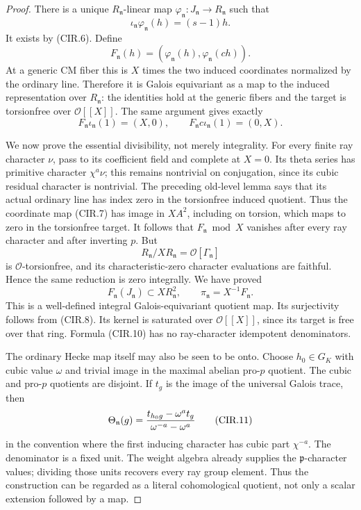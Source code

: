\begin{proof}
There is a unique \(R_{\mathfrak n}\)-linear map
\(\varphi_{\mathfrak n}:J_{\mathfrak n}\to R_{\mathfrak n}\)
such that
\[
 \iota_{\mathfrak n}\varphi_{\mathfrak n}(h)=(s-1)h.
\]
It exists by (CIR.6).  Define
\[
 F_{\mathfrak n}(h)=
       (\varphi_{\mathfrak n}(h),\varphi_{\mathfrak n}(ch)).
                                                               \tag{CIR.7}
\]
At a generic CM fiber this is \(X\) times the two induced
coordinates normalized by the ordinary line.  Therefore it is
Galois equivariant as a map to the induced representation over
\(R_{\mathfrak n}\): the identities hold at the generic fibers
and the target is torsionfree over \(\mathcal O[[X]]\).
The same argument gives exactly
\[
 F_{\mathfrak n}\iota_{\mathfrak n}(1)=(X,0),\qquad
 F_{\mathfrak n}c\iota_{\mathfrak n}(1)=(0,X).           \tag{CIR.8}
\]

We now prove the essential divisibility, not merely integrality.
For every finite ray character \(\nu\), pass to its coefficient
field and complete at \(X=0\).  Its theta series has primitive
character \(\chi^a\nu\); this remains nontrivial on conjugation,
since its cubic residual character is nontrivial.  The preceding
old-level lemma says that its actual ordinary line has index
zero in the torsionfree induced quotient.  Thus the coordinate
map (CIR.7) has image in \(XA^2\), including on torsion, which
maps to zero in the torsionfree target.  It follows that
\(F_{\mathfrak n}\bmod X\) vanishes after every ray character
and after inverting \(p\).  But
\[
 R_{\mathfrak n}/XR_{\mathfrak n}
                 =\mathcal O[\Gamma_{\mathfrak n}]      \tag{CIR.9}
\]
is \(\mathcal O\)-torsionfree, and its characteristic-zero
character evaluations are faithful.  Hence the same reduction
is zero integrally.  We have proved
\[
 F_{\mathfrak n}(J_{\mathfrak n})\subset XR_{\mathfrak n}^2,
 \qquad \pi_{\mathfrak n}=X^{-1}F_{\mathfrak n}.
                                                               \tag{CIR.10}
\]
This is a well-defined integral Galois-equivariant quotient map.
Its surjectivity follows from (CIR.8).  Its kernel is saturated
over \(\mathcal O[[X]]\), since its target is free over that
ring.  Formula (CIR.10) has no ray-character idempotent
denominators.

The ordinary Hecke map itself may also be seen to be onto.
Choose \(h_0\in G_K\) with cubic value \(\omega\) and trivial
image in the maximal abelian pro-\(p\) quotient.  The cubic and
pro-\(p\) quotients are disjoint.  If \(t_g\) is the image of
the universal Galois trace, then
\[
 \Theta_{\mathfrak n}(g)
       ={t_{h_0g}-\omega^{a}t_g\over\omega^{-a}-\omega^{a}}
                                                        \tag{CIR.11}
\]
in the convention where the first inducing character has cubic
part \(\chi^{-a}\).  The denominator is a fixed unit.  The weight
algebra already supplies the \(\mathfrak p\)-character values;
dividing those units recovers every ray group element.  Thus the
construction can be regarded as a literal cohomological quotient,
not only a scalar extension followed by a map.


\end{proof}
